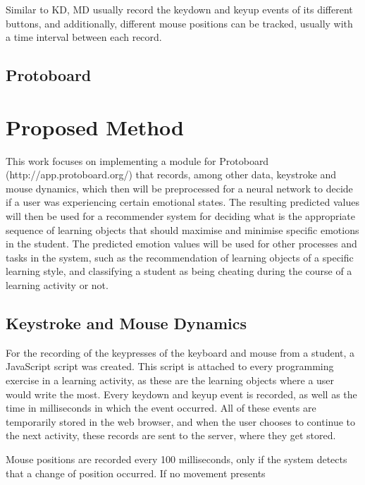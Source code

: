 \documentclass{acm_proc_article-sp}
\begin{document}
Similar to KD, MD usually record the keydown and keyup events of its
different buttons, and additionally, different mouse positions can be
tracked, usually with a time interval between each record.


\subsection{Protoboard}


\section{Proposed Method}

This work focuses on implementing a module for Protoboard (http://app.protoboard.org/) that
records, among other data, keystroke and mouse dynamics, which then
will be preprocessed for a neural network to decide if a user was
experiencing certain emotional states. The resulting predicted values
will then be used for a recommender system for deciding what is the
appropriate sequence of learning objects that should maximise and
minimise specific emotions in the student. The predicted emotion
values will be used for other processes and tasks in the system, such
as the recommendation of learning objects of a specific learning
style, and classifying a student as being cheating during the course
of a learning activity or not.


\subsection{Keystroke and Mouse Dynamics}

For the recording of the keypresses of the keyboard and mouse from a
student, a JavaScript script was created. This script is attached to
every programming exercise in a learning activity, as these are the
learning objects where a user would write the most. Every keydown and
keyup event is recorded, as well as the time in milliseconds in which the event
occurred. All of these events are temporarily stored in the web
browser, and when the user chooses to continue to the next activity,
these records are sent to the server, where they get stored.

Mouse positions are recorded every 100 milliseconds, only if the
system detects that a change of position occurred. If no movement presents




\balancecolumns
\end{document}
